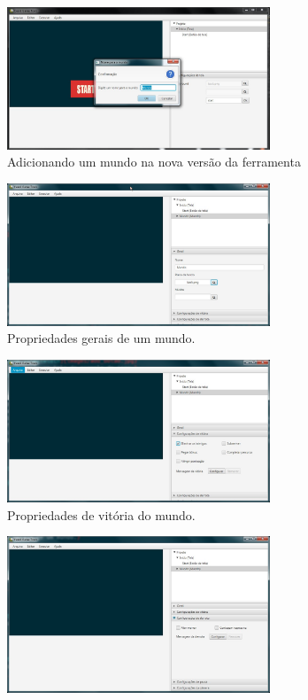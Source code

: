 \documentclass[12pt,twoside,openright,a4paper,english,brazil,sumario=tradicional]{abntex2}
\begin{document}
\begin{anexosenv}
   \begin{figure}[htb]
   \centering
   \includegraphics[width=0.7\textwidth]{images/add_mundo.jpg}
   \caption{Adicionando um mundo na nova versão da ferramenta}
   \label{fig:add_mundo}
   \end{figure}
   \begin{figure}[htb]
   \centering
   \includegraphics[width=0.7\textwidth]{images/add_mundo_2.jpg}
   \caption{Propriedades gerais de um mundo.}
   \label{fig:add_mundo_2}
   \end{figure}
   \begin{figure}[htb]
   \centering
   \includegraphics[width=0.7\textwidth]{images/add_mundo_3.jpg}
   \caption{Propriedades de vitória do mundo.}
   \label{fig:add_mundo_3}
   \end{figure}
   \begin{figure}[htb]
   \centering
   \includegraphics[width=0.7\textwidth]{images/add_mundo_4.jpg}

\end{figure}
\end{anexosenv}
\end{document}
